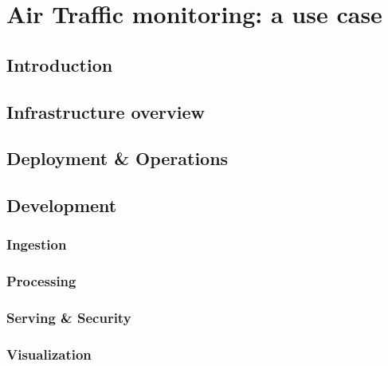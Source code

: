 \chapter{Air Traffic monitoring: a use case}

\section{Introduction}

\section{Infrastructure overview}

\section{Deployment \& Operations}

\section{Development}

\subsection{Ingestion}

\subsection{Processing}

\subsection{Serving \& Security}

\subsection{Visualization}